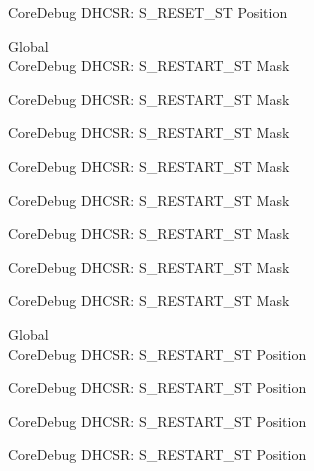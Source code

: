 \begin{DoxyRefList}
\label{deprecated__deprecated000562}%
%
Core\+Debug DHCSR\+: S\+\_\+\+RESET\+\_\+\+ST Position  
\item[Global \doxylink{group___c_m_s_i_s___s_c_b_gabe3254d40aaa482987ff31584d2a3240}{Core\+Debug\+\_\+\+DHCSR\+\_\+\+S\+\_\+\+RESTART\+\_\+\+ST\+\_\+\+Msk} ]\hfill \\
\label{deprecated__deprecated000008}%
%
Core\+Debug DHCSR\+: S\+\_\+\+RESTART\+\_\+\+ST Mask 

\label{deprecated__deprecated000108}%
%
Core\+Debug DHCSR\+: S\+\_\+\+RESTART\+\_\+\+ST Mask 

\label{deprecated__deprecated000162}%
%
Core\+Debug DHCSR\+: S\+\_\+\+RESTART\+\_\+\+ST Mask 

\label{deprecated__deprecated000247}%
%
Core\+Debug DHCSR\+: S\+\_\+\+RESTART\+\_\+\+ST Mask 

\label{deprecated__deprecated000304}%
%
Core\+Debug DHCSR\+: S\+\_\+\+RESTART\+\_\+\+ST Mask 

\label{deprecated__deprecated000380}%
%
Core\+Debug DHCSR\+: S\+\_\+\+RESTART\+\_\+\+ST Mask 

\label{deprecated__deprecated000459}%
%
Core\+Debug DHCSR\+: S\+\_\+\+RESTART\+\_\+\+ST Mask 

\label{deprecated__deprecated000561}%
%
Core\+Debug DHCSR\+: S\+\_\+\+RESTART\+\_\+\+ST Mask  
\item[Global \doxylink{group___c_m_s_i_s___s_c_b_gaf6498d32dbe23b8d95a12d2fbc0a65f8}{Core\+Debug\+\_\+\+DHCSR\+\_\+\+S\+\_\+\+RESTART\+\_\+\+ST\+\_\+\+Pos} ]\hfill \\
\label{deprecated__deprecated000007}%
%
Core\+Debug DHCSR\+: S\+\_\+\+RESTART\+\_\+\+ST Position 

\label{deprecated__deprecated000107}%
%
Core\+Debug DHCSR\+: S\+\_\+\+RESTART\+\_\+\+ST Position 

\label{deprecated__deprecated000161}%
%
Core\+Debug DHCSR\+: S\+\_\+\+RESTART\+\_\+\+ST Position 

\label{deprecated__deprecated000246}%
%
Core\+Debug DHCSR\+: S\+\_\+\+RESTART\+\_\+\+ST Position 


\end{DoxyRefList}

